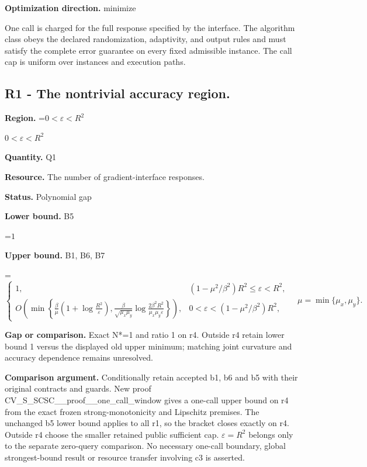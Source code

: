 \documentclass[10pt,a4paper]{article}
\newcommand{\AtlasMath}[1]{\par\begingroup\centering\setbox0=\hbox{$\displaystyle #1$}\ifdim\wd0>1.4\linewidth\typeout{ATLAS WIDE FORMULA: \the\wd0}\fi\ifdim\wd0>\linewidth\resizebox{\linewidth}{!}{\box0}\else\box0\fi\par\endgroup}
\newcommand{\AtlasInlineMath}[1]{\begingroup\setbox0=\hbox{$#1$}\ifdim\wd0>.4\linewidth\endgroup\AtlasMath{#1}\else\endgroup$#1$\fi}
\begin{document}
\textbf{Optimization direction.} minimize



One call is charged for the full response specified by the interface. The algorithm class obeys the declared randomization, adaptivity, and output rules and must satisfy the complete error guarantee on every fixed admissible instance. The call cap is uniform over instances and execution paths.



\subsection{R1 - The nontrivial accuracy region.}


\textbf{Region.} \AtlasInlineMath{0<\varepsilon<R^2}



\textbf{Quantity.} Q1



\textbf{Resource.} The number of gradient-interface responses.



\textbf{Status.} Polynomial gap



\textbf{Lower bound.} B5



\AtlasMath{1}


\textbf{Upper bound.} B1, B6, B7



\AtlasMath{\begin{cases}1,&(1-\mu^2/\beta^2)R^2\le\varepsilon<R^2,\\ O\!\left(\min\!\left\{\frac{\beta}{\mu}\left(1+\log\frac{R^2}{\varepsilon}\right),\frac{\beta}{\sqrt{\mu_x\mu_y}}\log\frac{2\beta^2R^2}{\mu_x\mu_y\varepsilon}\right\}\right),&0<\varepsilon<(1-\mu^2/\beta^2)R^2,\end{cases}\quad\mu=\min\{\mu_x,\mu_y\}.}


\textbf{Gap or comparison.} Exact N*=1 and ratio 1 on r4. Outside r4 retain lower bound 1 versus the displayed old upper minimum; matching joint curvature and accuracy dependence remains unresolved.



\textbf{Comparison argument.} Conditionally retain accepted b1, b6 and b5 with their original contracts and guards. New proof CV\_S\_SCSC\_\_proof\_\_one\_call\_window gives a one-call upper bound on r4 from the exact frozen strong-monotonicity and Lipschitz premises. The unchanged b5 lower bound applies to all r1, so the bracket closes exactly on r4. Outside r4 choose the smaller retained public sufficient cap. $\varepsilon =R^2$ belongs only to the separate zero-query comparison. No necessary one-call boundary, global strongest-bound result or resource transfer involving c3 is asserted.
\end{document}
